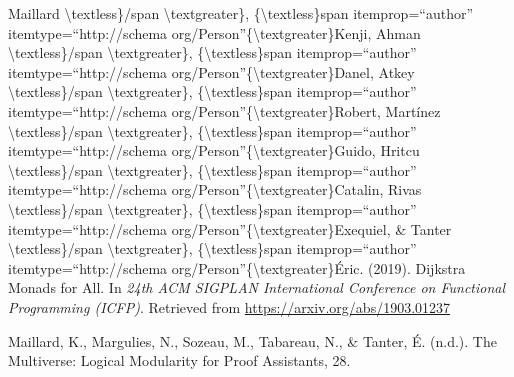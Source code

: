 \documentclass[12pt,twoside]{article}
\begin{document}
{\begin{thebibliography}{1079}
\mdbibitemlabel{}Maillard \textbackslash{}textless\}/span \textbackslash{}textgreater\},  \{\textbackslash{}textless\}span itemprop=\textquotedblleft{}author\textquotedblright{} itemtype=\textquotedblleft{}http://schema org/Person\textquotedblright{}\{\textbackslash{}textgreater\}Kenji, Ahman \textbackslash{}textless\}/span \textbackslash{}textgreater\},  \{\textbackslash{}textless\}span itemprop=\textquotedblleft{}author\textquotedblright{} itemtype=\textquotedblleft{}http://schema org/Person\textquotedblright{}\{\textbackslash{}textgreater\}Danel, Atkey \textbackslash{}textless\}/span \textbackslash{}textgreater\},  \{\textbackslash{}textless\}span itemprop=\textquotedblleft{}author\textquotedblright{} itemtype=\textquotedblleft{}http://schema org/Person\textquotedblright{}\{\textbackslash{}textgreater\}Robert, Martínez \textbackslash{}textless\}/span \textbackslash{}textgreater\},  \{\textbackslash{}textless\}span itemprop=\textquotedblleft{}author\textquotedblright{} itemtype=\textquotedblleft{}http://schema org/Person\textquotedblright{}\{\textbackslash{}textgreater\}Guido, Hritcu \textbackslash{}textless\}/span \textbackslash{}textgreater\},  \{\textbackslash{}textless\}span itemprop=\textquotedblleft{}author\textquotedblright{} itemtype=\textquotedblleft{}http://schema org/Person\textquotedblright{}\{\textbackslash{}textgreater\}Catalin, Rivas \textbackslash{}textless\}/span \textbackslash{}textgreater\},  \{\textbackslash{}textless\}span itemprop=\textquotedblleft{}author\textquotedblright{} itemtype=\textquotedblleft{}http://schema org/Person\textquotedblright{}\{\textbackslash{}textgreater\}Exequiel, \& Tanter \textbackslash{}textless\}/span \textbackslash{}textgreater\},  \{\textbackslash{}textless\}span itemprop=\textquotedblleft{}author\textquotedblright{} itemtype=\textquotedblleft{}http://schema org/Person\textquotedblright{}\{\textbackslash{}textgreater\}Éric. (2019). Dijkstra Monads for All. In \emph{24th ACM SIGPLAN International Conference on Functional Programming (ICFP)}. Retrieved from \href{https://arxiv.org/abs/1903.01237}{{\ttfamily https://\hspace{0pt}arxiv.\hspace{0pt}org/\hspace{0pt}abs/\hspace{0pt}1903.\hspace{0pt}01237}}%

\mdbibitemlabel{}Maillard, K., Margulies, N., Sozeau, M., Tabareau, N., \& Tanter, É. (n.d.). The Multiverse: Logical Modularity for Proof Assistants, 28.%


\end{thebibliography}}
\end{document}
